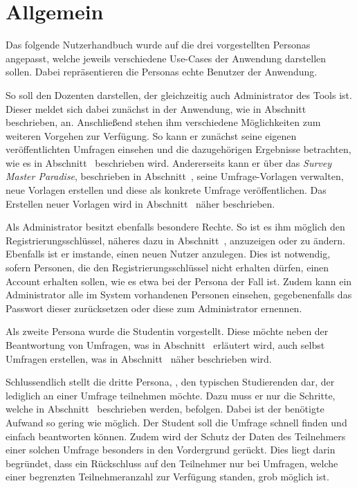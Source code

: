 
\section{Allgemein}

Das folgende Nutzerhandbuch wurde auf die drei vorgestellten Personas angepasst, welche jeweils verschiedene Use-Cases der Anwendung darstellen sollen.
Dabei repräsentieren die Personas echte Benutzer der Anwendung.

So soll \dutzi den Dozenten darstellen, der gleichzeitig auch Administrator des Tools ist.
Dieser meldet sich dabei zunächst in der Anwendung, wie in Abschnitt~ beschrieben, an.
Anschließend stehen ihm verschiedene Möglichkeiten zum weiteren Vorgehen zur Verfügung.
So kann er zunächst seine eigenen veröffentlichten Umfragen einsehen und die dazugehörigen Ergebnisse betrachten, wie es in Abschnitt~ beschrieben wird.
Andererseits kann er über das \emph{Survey Master Paradise}, beschrieben in Abschnitt~, seine Umfrage-Vorlagen verwalten, neue Vorlagen erstellen und diese als konkrete Umfrage veröffentlichen.
Das Erstellen neuer Vorlagen wird in Abschnitt~ näher beschrieben.

Als Administrator besitzt \dutzi ebenfalls besondere Rechte.
So ist es ihm möglich den Registrierungsschlüssel, näheres dazu in Abschnitt~, anzuzeigen oder zu ändern.
Ebenfalls ist er imstande, einen neuen Nutzer anzulegen.
Dies ist notwendig, sofern Personen, die den Registrierungsschlüssel nicht erhalten dürfen, einen Account erhalten sollen, wie es etwa bei der Persona \ariane der Fall ist.
Zudem kann ein Administrator alle im System vorhandenen Personen einsehen, gegebenenfalls das Passwort dieser zurücksetzen oder diese zum Administrator ernennen.

Als zweite Persona wurde die Studentin \ariane vorgestellt.
Diese möchte neben der Beantwortung von Umfragen, was in Abschnitt~ erläutert wird, auch selbst Umfragen erstellen, was in Abschnitt~ näher beschrieben wird.

Schlussendlich stellt die dritte Persona, \weigert, den typischen Studierenden dar, der lediglich an einer Umfrage teilnehmen möchte.
Dazu muss er nur die Schritte, welche in Abschnitt~ beschrieben werden, befolgen.
Dabei ist der benötigte Aufwand so gering wie möglich.
Der Student soll die Umfrage schnell finden und einfach beantworten können.
Zudem wird der Schutz der Daten des Teilnehmers einer solchen Umfrage besonders in den Vordergrund gerückt.
Dies liegt darin begründet, dass ein Rückschluss auf den Teilnehmer nur bei Umfragen, welche einer begrenzten Teilnehmeranzahl zur Verfügung standen, grob möglich ist.

